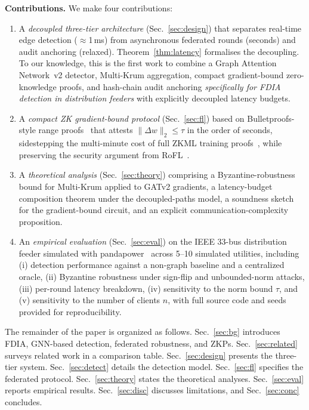 \documentclass[conference]{IEEEtran}
\begin{document}
\textbf{Contributions.} We make four contributions:
\begin{enumerate}
    \item A \emph{decoupled three-tier architecture} (Sec.~\ref{sec:design}) that separates real-time edge detection ($\approx$1\,ms) from asynchronous federated rounds (seconds) and audit anchoring (relaxed). Theorem~\ref{thm:latency} formalises the decoupling. To our knowledge, this is the first work to combine a Graph Attention Network~v2 detector, Multi-Krum aggregation, compact gradient-bound zero-knowledge proofs, and hash-chain audit anchoring \emph{specifically for FDIA detection in distribution feeders} with explicitly decoupled latency budgets.
    \item A \emph{compact ZK gradient-bound protocol} (Sec.~\ref{sec:fl}) based on Bulletproofs-style range proofs~\cite{bunz2018bulletproofs} that attests $\|\Delta w\|_2 \le \tau$ in the order of seconds, sidestepping the multi-minute cost of full ZKML training proofs~\cite{abbaszadeh2024zkpot,garg2023zkpot}, while preserving the security argument from RoFL~\cite{lycklama2023rofl}.
    \item A \emph{theoretical analysis} (Sec.~\ref{sec:theory}) comprising a Byzantine-robustness bound for Multi-Krum applied to GATv2 gradients, a latency-budget composition theorem under the decoupled-paths model, a soundness sketch for the gradient-bound circuit, and an explicit communication-complexity proposition.
    \item An \emph{empirical evaluation} (Sec.~\ref{sec:eval}) on the IEEE 33-bus distribution feeder simulated with pandapower~\cite{thurner2018pandapower} across 5--10 simulated utilities, including (i) detection performance against a non-graph baseline and a centralized oracle, (ii) Byzantine robustness under sign-flip and unbounded-norm attacks, (iii) per-round latency breakdown, (iv) sensitivity to the norm bound $\tau$, and (v) sensitivity to the number of clients $n$, with full source code and seeds provided for reproducibility.
\end{enumerate}

The remainder of the paper is organized as follows. Sec.~\ref{sec:bg} introduces FDIA, GNN-based detection, federated robustness, and ZKPs. Sec.~\ref{sec:related} surveys related work in a comparison table. Sec.~\ref{sec:design} presents the three-tier system. Sec.~\ref{sec:detect} details the detection model. Sec.~\ref{sec:fl} specifies the federated protocol. Sec.~\ref{sec:theory} states the theoretical analyses. Sec.~\ref{sec:eval} reports empirical results. Sec.~\ref{sec:disc} discusses limitations, and Sec.~\ref{sec:conc} concludes.
\end{document}

